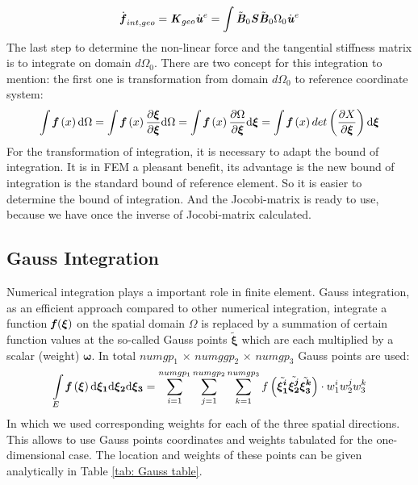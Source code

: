 \begin{equation}
\dot{\textbf{\textit{f}}}_{int,geo} = \textbf{\textit{K}}_{geo} \dot{\textbf{\textit{u}}}^e =\int \tilde{\textbf{\textit{B}}}_0 \textbf{\textit{S}} \tilde{\textbf{\textit{B}}}_0 \mathrm{\Omega_0} \dot{\textbf{\textit{u}}}^e
\end{equation}
The last step to determine the non-linear force and the tangential stiffness matrix is to integrate on domain $d\Omega_0$. There are two concept for this integration to mention: the first one is transformation from domain $d\Omega_0$ to reference coordinate system:
\begin{equation}
\int {\textbf{\textit{f}}}\left(x\right) \mathrm{d}\Omega = \int {\textbf{\textit{f}}}\left(x\right) \frac{\partial \boldsymbol{\xi}}{\partial \boldsymbol{\xi}} \mathrm{d}\Omega = \int {\textbf{\textit{f}}}\left(x\right) \frac{\partial \Omega}{\partial \boldsymbol{\xi}} \mathrm{d}\boldsymbol{\xi} = \int {\textbf{\textit{f}}}\left(x\right) det \left(\frac{\partial X}{\partial \boldsymbol{\xi}}\right) \mathrm{d}\boldsymbol{\xi}
\end{equation}
For the transformation of integration, it is necessary to adapt the bound of integration. It is in FEM a pleasant benefit, its advantage is the new bound of integration is the standard bound of reference element. So it is easier to determine the bound of integration. And the Jocobi-matrix is ready to use, because we have once the inverse of Jocobi-matrix calculated.

\subsection{Gauss Integration}
Numerical integration plays a important role in finite element. Gauss integration, as an efficient approach compared to other numerical integration, integrate a function $\textbf{\textit{f}}(\boldsymbol{\xi})$ on the spatial domain $\Omega$ is replaced by a summation of certain function values at the so-called Gauss points $\tilde{\boldsymbol{\xi}}$ which are each multiplied by a scalar (weight) $\boldsymbol{\omega}$.  In total $numgp_1$ $\times$ $numggp_2$ $\times$ $numgp_3$ Gauss points are used:
\begin{equation}
\int \limits_E {\textbf{\textit{f}}} \left(\boldsymbol{\xi}\right) \mathrm{d\boldsymbol{\xi_1}}\mathrm{d\boldsymbol{\xi_2}}\mathrm{d\boldsymbol{\xi_3}} = \displaystyle\sum_{i=1}^{numgp_1}\displaystyle\sum_{j=1}^{numgp_2} \displaystyle\sum_{k=1}^{numgp_3} f\left(\tilde{\boldsymbol{\xi_1^i}}\tilde{\boldsymbol{\xi_2^j}}\tilde{\boldsymbol{\xi_3^k}}\right)\cdot w_1^i w_2^j w_3^k
\end{equation}
In which we used corresponding weights for each of the three spatial directions. This allows to use Gauss points coordinates and weights tabulated for the one-dimensional case. The location and weights of these points can be given analytically in Table \ref{tab: Gauss table}.
	
